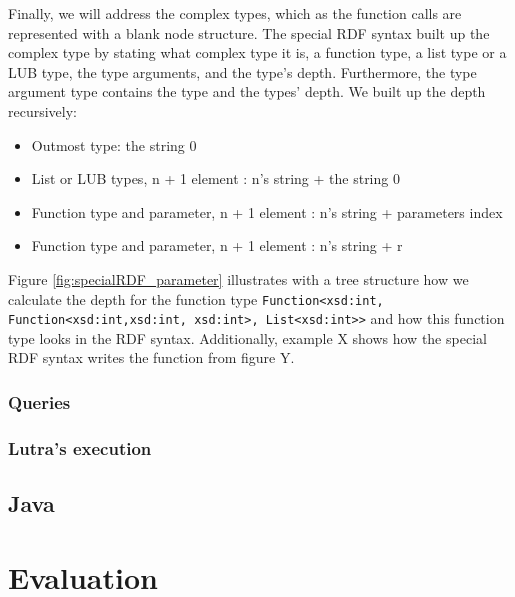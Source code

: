 \para
Finally, we will address the complex types, which as the function calls are represented with a blank node structure. The special RDF syntax built up the complex type by stating what complex type it is, a function type, a list type or a LUB type, the type arguments, and the type's depth. Furthermore, the type argument type contains the type and the types' depth. We built up the depth recursively:
\begin{itemize}
  \item Outmost type: the string 0
  \item List or LUB types, n + 1 element : n's string +  the string 0
  \item Function type and parameter, n + 1 element : n's string + parameters index 
  \item Function type and parameter, n + 1 element : n's string + r
\end{itemize}
Figure \ref{fig:specialRDF_parameter} illustrates with a tree structure how we calculate the depth for the function type \lstinline{Function<xsd:int, Function<xsd:int,xsd:int, xsd:int>, List<xsd:int>>} and how this function type looks in the RDF syntax. Additionally, example X shows how the special RDF syntax writes the function from figure Y. 


\subsubsection{Queries}

\subsubsection{Lutra's execution}

\subsection{Java}

\section{Evaluation}
\label{implementation_evaluation}

